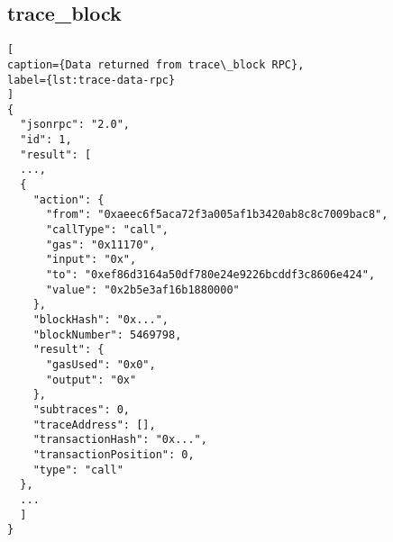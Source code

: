 \subsection*{trace\_block}

\begin{lstlisting}[
caption={Data returned from trace\_block RPC},
label={lst:trace-data-rpc}
]
{
  "jsonrpc": "2.0",
  "id": 1,
  "result": [
  ...,
  {
    "action": {
      "from": "0xaeec6f5aca72f3a005af1b3420ab8c8c7009bac8",
      "callType": "call",
      "gas": "0x11170",
      "input": "0x",
      "to": "0xef86d3164a50df780e24e9226bcddf3c8606e424",
      "value": "0x2b5e3af16b1880000"
    },
    "blockHash": "0x...",
    "blockNumber": 5469798,
    "result": {
      "gasUsed": "0x0",
      "output": "0x"
    },
    "subtraces": 0,
    "traceAddress": [],
    "transactionHash": "0x...",
    "transactionPosition": 0,
    "type": "call"
  },
  ...
  ]
}
\end{lstlisting}
